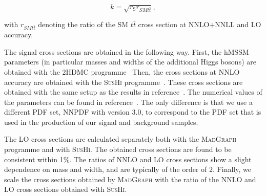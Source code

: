 \begin{equation}
k = \sqrt{r_\text{S} r_{SM t\bar t}},
\end{equation}

with $r_{SM t\bar t}$ denoting the ratio of the SM $t\bar t$ cross section at NNLO+NNLL and LO accuracy.

The signal cross sections are obtained in the following way.
First, the hMSSM parameters (in particular masses and widths of the additional Higgs bosons) are obtained with the \textsc{2HDMC} programme~\cite{2hdmc}
Then, the cross sections at NNLO accuracy are obtained with the \textsc{SusHi} programme~\cite{sushi}.
These cross sections are obtained with the same setup as the results in reference~\cite{deFlorian:2016spz}.
The numerical values of the parameters can be found in reference~\cite{LHCHXSWGMSSM}.
The only difference is that we use a different PDF set, \textsc{NNPDF} with version 3.0, to correspond to the PDF set that is used in the production of our signal and background samples.

The LO cross sections are calculated separately both with the \textsc{MadGraph} programme and with \textsc{SusHi}. The obtained cross sections are found to be consistent within 1\%.
The ratios of NNLO and LO cross sections show a slight dependence on mass and width, and are typically of the order of 2. Finally, we scale the cross sections obtained by \textsc{MadGraph} with the ratio of the NNLO and LO cross sections obtained with \textsc{SusHi}.

